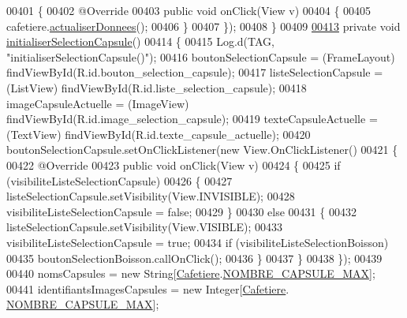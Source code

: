 \begin{DoxyCode}
00401         \{
00402             @Override
00403             \textcolor{keyword}{public} \textcolor{keywordtype}{void} onClick(View v)
00404             \{
00405                 cafetiere.\hyperlink{classcom_1_1example_1_1ekawa_1_1_cafetiere_a1c6b2ea0e069cda876260e18ea8f6e84}{actualiserDonnees}();
00406             \}
00407         \});
00408     \}
00409 
\hyperlink{classcom_1_1example_1_1ekawa_1_1_ihm_a32a1b0d802eef67b6c838d8839de7bdb}{00413}     \textcolor{keyword}{private} \textcolor{keywordtype}{void} \hyperlink{classcom_1_1example_1_1ekawa_1_1_ihm_a32a1b0d802eef67b6c838d8839de7bdb}{initialiserSelectionCapsule}()
00414     \{
00415         Log.d(TAG, \textcolor{stringliteral}{"initialiserSelectionCapsule()"});
00416         boutonSelectionCapsule = (FrameLayout) findViewById(R.id.bouton\_selection\_capsule);
00417         listeSelectionCapsule = (ListView) findViewById(R.id.liste\_selection\_capsule);
00418         imageCapsuleActuelle = (ImageView) findViewById(R.id.image\_selection\_capsule);
00419         texteCapsuleActuelle = (TextView) findViewById(R.id.texte\_capsule\_actuelle);
00420         boutonSelectionCapsule.setOnClickListener(\textcolor{keyword}{new} View.OnClickListener()
00421         \{
00422             @Override
00423             \textcolor{keyword}{public} \textcolor{keywordtype}{void} onClick(View v)
00424             \{
00425                 \textcolor{keywordflow}{if} (visibiliteListeSelectionCapsule)
00426                 \{
00427                     listeSelectionCapsule.setVisibility(View.INVISIBLE);
00428                     visibiliteListeSelectionCapsule = \textcolor{keyword}{false};
00429                 \}
00430                 \textcolor{keywordflow}{else}
00431                 \{
00432                     listeSelectionCapsule.setVisibility(View.VISIBLE);
00433                     visibiliteListeSelectionCapsule = \textcolor{keyword}{true};
00434                     \textcolor{keywordflow}{if} (visibiliteListeSelectionBoisson)
00435                         boutonSelectionBoisson.callOnClick();
00436                 \}
00437             \}
00438         \});
00439 
00440         nomsCapsules = \textcolor{keyword}{new} String[\hyperlink{classcom_1_1example_1_1ekawa_1_1_cafetiere}{Cafetiere}.\hyperlink{classcom_1_1example_1_1ekawa_1_1_cafetiere_a183d96e89c056c4ac9c565bf8f24851e}{NOMBRE\_CAPSULE\_MAX}];
00441         identifiantsImagesCapsules = \textcolor{keyword}{new} Integer[\hyperlink{classcom_1_1example_1_1ekawa_1_1_cafetiere}{Cafetiere}.
      \hyperlink{classcom_1_1example_1_1ekawa_1_1_cafetiere_a183d96e89c056c4ac9c565bf8f24851e}{NOMBRE\_CAPSULE\_MAX}];

\end{DoxyCode}
